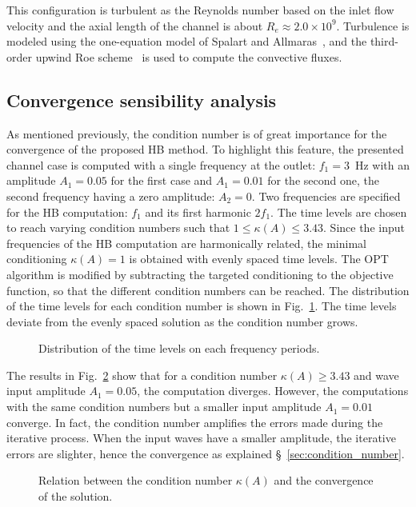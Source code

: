 This configuration is turbulent as the Reynolds number based on the
inlet flow velocity and the axial length of the channel is about $R_e
\approx 2.0 \times 10^9$.  Turbulence is modeled using the
one-equation model of Spalart and Allmaras~\cite{Spalart1992}, and the
third-order upwind Roe scheme~\cite{Roe1981} is used to compute the
convective fluxes.

\subsection{Convergence sensibility analysis}

As mentioned previously, the condition number is of great importance
for the convergence of the proposed HB method. To highlight this
feature, the presented channel case is computed with a single
frequency at the outlet: $f_1 = 3$~Hz with an amplitude $A_1 = 0.05$
for the first case and $A_1=0.01$ for the second one, the second
frequency having a zero amplitude: $A_2= 0$.  Two frequencies are
specified for the HB computation: $f_1$ and its first harmonic
$2f_1$. The time levels are chosen to reach varying condition numbers
such that $1 \leq \kappa (A) \leq 3.43$.  Since the input frequencies of the HB
computation are harmonically related, the minimal conditioning
$\kappa(A) = 1$ is obtained with evenly spaced time levels.  The OPT
algorithm is modified by subtracting the targeted conditioning to the
objective function, so that the different condition numbers can be
reached.  The distribution of the time levels for each condition
number is shown in Fig.~\ref{fig:canal2_distribution_tlv}.  The time
levels deviate from the evenly spaced solution as the condition number
grows.
\begin{figure}[htb]
  \centering {}
  \quad {}
  \caption{Distribution of the time levels on each frequency periods.}
  \label{fig:canal2_distribution_tlv}
\end{figure}
The results in Fig.~\ref{fig:canal_residual_vs_conditionning} show that
for a condition number $\kappa (A) \geq 3.43$ and wave input amplitude
$A_1 = 0.05$, the computation diverges. However, the computations with
the same condition numbers but a smaller input amplitude $A_1 = 0.01$
converge. In fact, the condition number amplifies the errors made
during the iterative process. When the input waves have a smaller
amplitude, the iterative errors are slighter, hence the convergence as
explained \S~\ref{sec:condition_number}.
\begin{figure}[htb]
  \centering {}
  \quad
  \caption{Relation between the condition number $\kappa (A)$ and the
    convergence of the solution.}
  \label{fig:canal_residual_vs_conditionning}
\end{figure}


